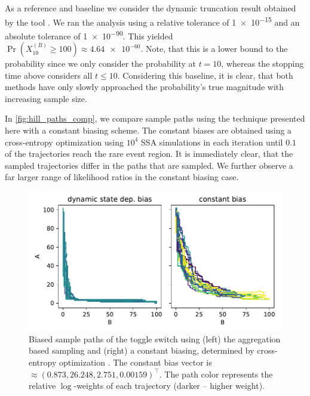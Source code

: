 As a reference and baseline we consider the dynamic truncation result
obtained by the  tool
\parencite{lapin2011shave}.
We ran the analysis using a relative tolerance of \num{1e-15} and an
absolute tolerance of \num{1e-90}.
This yielded \(\Pr(X_{10}^{(B)} \geq 100) \approx \num{4.64e-60}\).
Note, that this is a lower bound to the probability since we only
consider the probability at $t=10$, whereas the stopping time above
considers all $t\leq 10$.
Considering this baseline, it is clear, that both methods have only
slowly approached the probability's true magnitude with increasing sample size.

In \autoref{fig:hill_paths_comp}, we compare sample paths using the
technique presented here with a constant biasing scheme.
The constant biases are obtained using a cross-entropy optimization
using $10^4$ \ac{SSA} simulations in each iteration until $0.1$ of
the trajectories reach the rare event region.
It is immediately clear, that the sampled trajectories differ in the
paths that are sampled.
We further observe a far larger range of likelihood ratios in the
constant biasing case.
\begin{figure}[htb]
  \centering
  \includegraphics[scale=.6]{gfx/hill_paths_comp.pdf}
  \caption[Comparison of biased sample
  paths]{\label{fig:hill_paths_comp}Biased sample paths of the toggle
    switch using (left) the aggregation based sampling and (right) a
    constant biasing, determined by cross-entropy optimization
    \parencite{daigle2011automated}. The constant bias vector is
    $\approx (0.873, 26.248, 2.751, 0.00159)^{\top}$. The path color
    represents the relative $\log$-weights of each trajectory (darker
  -- higher weight).}
\end{figure}

